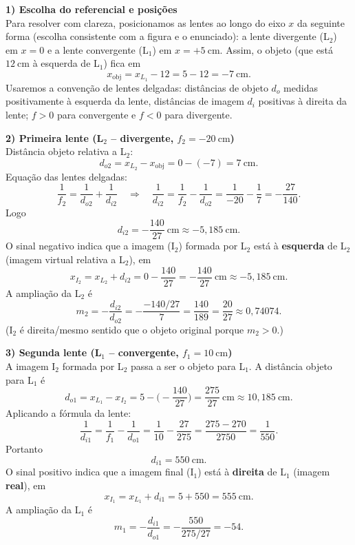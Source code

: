 \begin{flushleft}
\textbf{1) Escolha do referencial e posi\c{c}\~oes} \\
Para resolver com clareza, posicionamos as lentes ao longo do eixo $x$ da seguinte forma (escolha consistente com a figura e o enunciado): a lente divergente (L$_2$) em $x=0$ e a lente convergente (L$_1$) em $x=+5\ \mathrm{cm}$. Assim, o objeto (que est\'a $12\ \mathrm{cm}$ \`a esquerda de L$_1$) fica em
\[
x_{\text{obj}}=x_{L_1}-12=5-12=-7\ \mathrm{cm}.
\]
Usaremos a conven\c{c}\~ao de lentes delgadas: dist\^ancias de objeto $d_o$ medidas positivamente \`a esquerda da lente, dist\^ancias de imagem $d_i$ positivas \`a direita da lente; $f>0$ para convergente e $f<0$ para divergente.

\medskip

\textbf{2) Primeira lente (L$_2$ -- divergente, $f_2=-20\ \mathrm{cm}$)} \\
Dist\^ancia objeto relativa a L$_2$:
\[
d_{o2}=x_{L_2}-x_{\text{obj}}=0-(-7)=7\ \mathrm{cm}.
\]
Equa\c{c}\~ao das lentes delgadas:
\[
\frac{1}{f_2}=\frac{1}{d_{o2}}+\frac{1}{d_{i2}}
\quad\Rightarrow\quad
\frac{1}{d_{i2}}=\frac{1}{f_2}-\frac{1}{d_{o2}}
=\frac{1}{-20}-\frac{1}{7}=-\frac{27}{140}.
\]
Logo
\[
d_{i2}=-\frac{140}{27}\ \mathrm{cm}\approx -5{,}185\ \mathrm{cm}.
\]
O sinal negativo indica que a imagem (I$_2$) formada por L$_2$ est\'a \`a \textbf{esquerda} de L$_2$ (imagem virtual relativa a L$_2$), em
\[
x_{I_2}=x_{L_2}+d_{i2}=0-\frac{140}{27}=-\frac{140}{27}\ \mathrm{cm}\approx -5{,}185\ \mathrm{cm}.
\]
A amplia\c{c}\~ao da L$_2$ \'e
\[
m_2=-\frac{d_{i2}}{d_{o2}}=-\frac{-140/27}{7}=\frac{140}{189}=\frac{20}{27}\approx 0{,}74074.
\]
(I$_2$ \'e direita/mesmo sentido que o objeto original porque $m_2>0$.)

\medskip

\textbf{3) Segunda lente (L$_1$ -- convergente, $f_1=10\ \mathrm{cm}$)} \\
A imagem I$_2$ formada por L$_2$ passa a ser o objeto para L$_1$. A dist\^ancia objeto para L$_1$ \'e
\[
d_{o1}=x_{L_1}-x_{I_2}=5-\Big(-\frac{140}{27}\Big)=\frac{275}{27}\ \mathrm{cm}\approx 10{,}185\ \mathrm{cm}.
\]
Aplicando a f\'ormula da lente:
\[
\frac{1}{d_{i1}}=\frac{1}{f_1}-\frac{1}{d_{o1}}
=\frac{1}{10}-\frac{27}{275}=\frac{275-270}{2750}=\frac{1}{550}.
\]
Portanto
\[
d_{i1}=550\ \mathrm{cm}.
\]
O sinal positivo indica que a imagem final (I$_1$) est\'a \`a \textbf{direita} de L$_1$ (imagem \textbf{real}), em
\[
x_{I_1}=x_{L_1}+d_{i1}=5+550=555\ \mathrm{cm}.
\]
A amplia\c{c}\~ao da L$_1$ \'e
\[
m_1=-\frac{d_{i1}}{d_{o1}}
=-\frac{550}{275/27}=-54.
\]


\end{flushleft}
